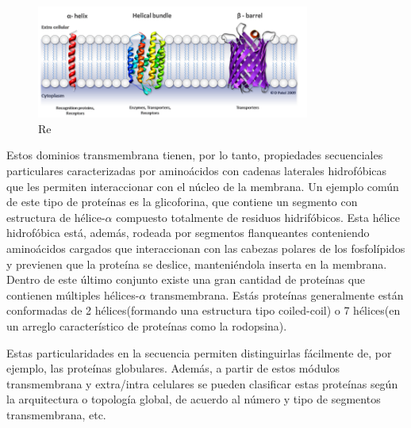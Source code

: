 \begin{figure}[h]
\centering
\includegraphics[width=0.8\textwidth]{img/proteinasMembrana.png} 
\caption{Re} 
\label{proteinasMembrana}
\end{figure}


Estos dominios transmembrana tienen, por lo tanto, propiedades secuenciales particulares caracterizadas por aminoácidos con cadenas laterales hidrofóbicas que les permiten interaccionar con el núcleo de la membrana.
Un ejemplo común de este tipo de proteínas es la glicoforina, que contiene un segmento con estructura de hélice-$\alpha$ compuesto totalmente de residuos hidrifóbicos. 
Esta hélice hidrofóbica está, además, rodeada por segmentos flanqueantes conteniendo aminoácidos cargados que interaccionan con las cabezas polares de los fosfolípidos y previenen que la proteína se deslice,
manteniéndola inserta en la membrana.
Dentro de este último conjunto existe una gran cantidad de proteínas que contienen múltiples hélices-$\alpha$ transmembrana. Estás proteínas generalmente están conformadas de 2 hélices(formando una estructura tipo coiled-coil)
o 7 hélices(en un arreglo característico de proteínas como la rodopsina).

Estas particularidades en la secuencia permiten distinguirlas fácilmente de, por ejemplo, las proteínas globulares. 
Además, a partir de estos módulos transmembrana y extra/intra celulares se pueden clasificar estas proteínas según la arquitectura o topología global, de acuerdo al número y tipo de segmentos transmembrana, etc.



















